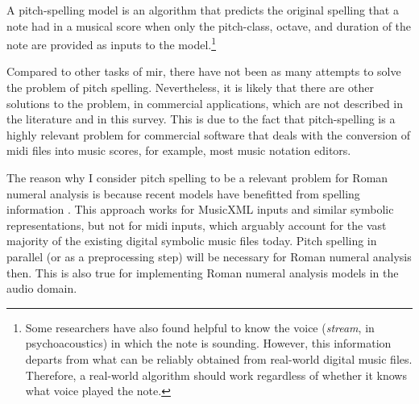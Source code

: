 

A pitch-spelling model is an algorithm that predicts the
original spelling that a note had in a musical score when
only the pitch-class, octave, and duration of the note are
provided as inputs to the model.\footnote{Some researchers
have also found helpful to know the voice (\emph{stream}, in
psychoacoustics) in which the note is sounding. However,
this information departs from what can be reliably obtained
from real-world digital music files. Therefore, a real-world
algorithm should work regardless of whether it knows what
voice played the note.}


Compared to other tasks of \gls{mir}, there have not been as
many attempts to solve the problem of pitch spelling.
Nevertheless, it is likely that there are other solutions to
the problem, in commercial applications, which are not
described in the literature and in this survey. This is due
to the fact that pitch-spelling is a highly relevant problem
for commercial software that deals with the conversion of
\gls{midi} files into music scores, for example, most music
notation editors.

The reason why I consider pitch spelling to be a relevant
problem for Roman numeral analysis is because recent models
have benefitted from spelling information
\parencite{micchi2020not}. This approach works for MusicXML
inputs and similar symbolic representations, but not for
\gls{midi} inputs, which arguably account for the vast
majority of the existing digital symbolic music files today.
Pitch spelling in parallel (or as a preprocessing step) will
be necessary for Roman numeral analysis then. This is also
true for implementing Roman numeral analysis models in the
audio domain.
